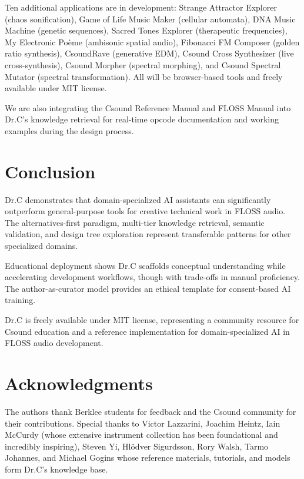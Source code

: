 \documentclass[a4paper]{article}
\begin{document}
Ten additional applications are in development: Strange Attractor Explorer (chaos sonification), Game of Life Music Maker (cellular automata), DNA Music Machine (genetic sequences), Sacred Tones Explorer (therapeutic frequencies), My Electronic Poème \cite{varese1958poeme} (ambisonic spatial audio), Fibonacci FM Composer \cite{chowning1977stria} (golden ratio synthesis), CsoundRave \cite{bt2005binary} (generative EDM), Csound Cross Synthesizer (live cross-synthesis), Csound Morpher (spectral morphing), and Csound Spectral Mutator (spectral transformation). All will be browser-based tools and freely available under MIT license.

We are also integrating the Csound Reference Manual and FLOSS Manual into Dr.C's knowledge retrieval for real-time opcode documentation and working examples during the design process.

\section{Conclusion}
\label{sec:conclusion}

Dr.C demonstrates that domain-specialized AI assistants can significantly outperform general-purpose tools for creative technical work in FLOSS audio. The alternatives-first paradigm, multi-tier knowledge retrieval, semantic validation, and design tree exploration represent transferable patterns for other specialized domains.

Educational deployment shows Dr.C scaffolds conceptual understanding while accelerating development workflows, though with trade-offs in manual proficiency. The author-as-curator model provides an ethical template for consent-based AI training.

Dr.C is freely available under MIT license, representing a community resource for Csound education and a reference implementation for domain-specialized AI in FLOSS audio development.

\section{Acknowledgments}

The authors thank Berklee students for feedback and the Csound community for their contributions. Special thanks to Victor Lazzarini, Joachim Heintz, Iain McCurdy (whose extensive instrument collection has been foundational and incredibly inspiring), Steven Yi, Hlödver Sigurdsson, Rory Walsh, Tarmo Johannes, and Michael Gogins whose reference materials, tutorials, and models form Dr.C's knowledge base.
\end{document}
